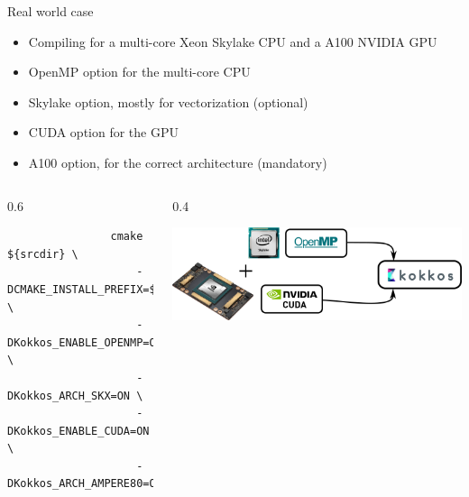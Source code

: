 \documentclass[aspectratio=169]{beamer}
\begin{document}
\begin{frame}[fragile]{Real world case}
    \begin{itemize}
        \item Compiling for a multi-core Xeon Skylake CPU and a A100 NVIDIA GPU
        \item OpenMP option for the multi-core CPU
        \item Skylake option, mostly for vectorization (optional)
        \item CUDA option for the GPU
        \item A100 option, for the correct architecture (mandatory)
    \end{itemize}
    \begin{columns}
        \begin{column}{0.6\linewidth}
            \begin{verbatim}
                cmake ${srcdir} \
                    -DCMAKE_INSTALL_PREFIX=${kokkos_install_folder} \
                    -DKokkos_ENABLE_OPENMP=ON \
                    -DKokkos_ARCH_SKX=ON \
                    -DKokkos_ENABLE_CUDA=ON \
                    -DKokkos_ARCH_AMPERE80=ON
            \end{verbatim}
        \end{column}
        \begin{column}{0.4\linewidth}
            \begin{center}
                \includegraphics[width=\textwidth]{kokkos_a100_backend.png}
            \end{center}
        \end{column}
    \end{columns}
\end{frame}

\end{document}
